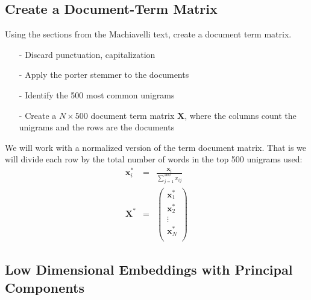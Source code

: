 \documentclass[letterpaper,12pt]{article}
\numberwithin{equation}{section}
\numberwithin{equation}{section}
\begin{document}
\subsection*{Create a Document-Term Matrix}

Using the sections from the Machiavelli text, create a document term matrix.
\begin{itemize}
\item[-] Discard punctuation, capitalization
\item[-] Apply the porter stemmer to the documents
\item[-] Identify the 500 most common unigrams
\item[-] Create a $N \times 500$ document term matrix $\boldsymbol{X}$, where the columns count the unigrams and the rows are the documents
\end{itemize}


We will work with a normalized version of the term document matrix.  That is we will divide each row by the total number of words in the top 500 unigrams used:
\begin{eqnarray}
\boldsymbol{x}_{i}^{*} & = & \frac{\boldsymbol{x}_{i}}{\sum_{j=1}^{500} x_{ij}} \nonumber\\
\boldsymbol{X}^{*} & = & \begin{pmatrix} \boldsymbol{x}_{1}^{*} \\
\boldsymbol{x}_{2}^{*} \\
\vdots \\
\boldsymbol{x}_{N}^{*} \\
  \end{pmatrix}  \nonumber
\end{eqnarray}




\subsection*{Low Dimensional Embeddings with Principal Components}
\end{document}
